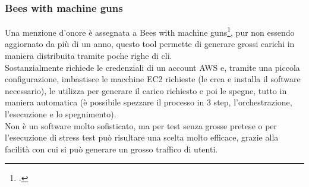 \subsubsection{Bees with machine guns}
Una menzione d'onore è assegnata a Bees with machine guns\footcite{site:bees}, pur non essendo aggiornato da più di un anno, questo tool permette di generare grossi carichi in maniera distribuita tramite poche righe di \gls{cli}.\\
Sostanzialmente richiede le credenziali di un account AWS e, tramite una piccola configurazione, imbastisce le macchine EC2 richieste (le crea e installa il software necessario), le utilizza per generare il carico richiesto e poi le spegne, tutto in maniera automatica (è possibile spezzare il processo in 3 step, l'orchestrazione, l'esecuzione e lo spegnimento).\\
Non è un software molto sofisticato, ma per test senza grosse pretese o per l'esecuzione di stress test può risultare una scelta molto efficace,  grazie alla facilità con cui si può generare un grosso traffico di utenti. 

